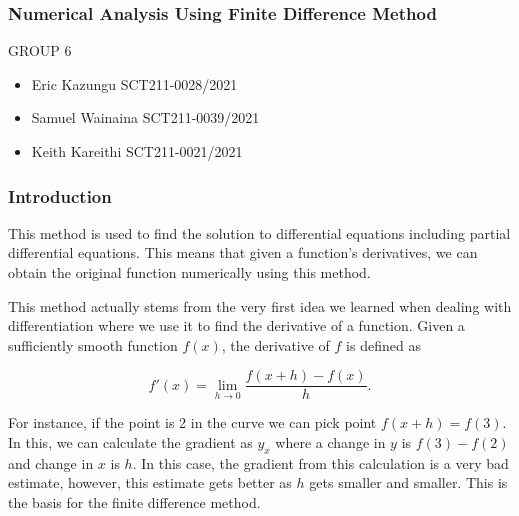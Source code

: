 \documentclass{beamer}
\begin{document}
\begin{frame}
  \frametitle{Numerical Analysis Using Finite Difference Method}
    \begin{center}
    \Large{GROUP 6}
  \end{center}
 
  \vspace{1cm}
  
 
  \begin{itemize}
    \item Eric Kazungu SCT211-0028/2021
    \item Samuel Wainaina SCT211-0039/2021
    \item Keith Kareithi SCT211-0021/2021
  \end{itemize}
  
\end{frame}

\begin{frame}
\frametitle{Introduction}

This method is used to find the solution to differential equations including partial differential equations. This means that given a function's derivatives, we can obtain the original function numerically using this method. 

\pause

This method actually stems from the very first idea we learned when dealing with differentiation where we use it to find the derivative of a function. Given a sufficiently smooth function $f(x)$, the derivative of $f$ is defined as

\[
f'(x) = \lim_{h\to 0} \frac{f(x+h) - f(x)}{h}.
\]

\pause

For instance, if the point is 2 in the curve we can pick point $f(x + h) = f(3)$. In this, we can calculate the gradient as $y_x$ where a change in $y$ is $f(3) - f(2)$ and change in $x$ is $h$. In this case, the gradient from this calculation is a very bad estimate, however, this estimate gets better as $h$ gets smaller and smaller. This is the basis for the finite difference method.

\end{frame}
\end{document}
